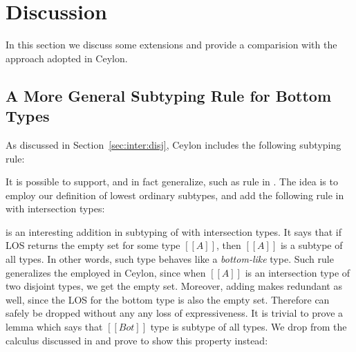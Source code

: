 \section{Discussion}
\label{sec:discussion}
In this section we discuss some extensions and provide a comparision with the approach
adopted in Ceylon.

\subsection{A More General Subtyping Rule for Bottom  Types}
\label{sec:inter:refactoring}
As discussed in Section~\ref{sec:inter:disj}, Ceylon includes the following subtyping rule:

\begin{center}
\end{center}

\noindent It is possible to support, and in fact generalize, such as rule in \name. The idea is to
employ our definition of lowest ordinary subtypes, and add the following rule 
in \cal with intersection types:

\begin{center}
\end{center}

\noindent {} is an interesting addition in subtyping of \cal with intersection types.
It says that if LOS returns the empty set for some type $[[A]]$, then $[[A]]$
is a subtype of all types. In other words, such type behaves like a \emph{bottom-like} type.
Such rule generalizes the 
employed in Ceylon, since when $[[A]]$ is an intersection type of two
disjoint types, we get the empty set.
Moreover, adding  makes  redundant as well, since the LOS for
the bottom type is also the empty set. Therefore  can safely be dropped without any
any loss of expressiveness. It is trivial to prove a lemma which says that $[[Bot]]$ type is
subtype of all types. We drop  from the calculus discussed in 
and prove  to show this property instead:

